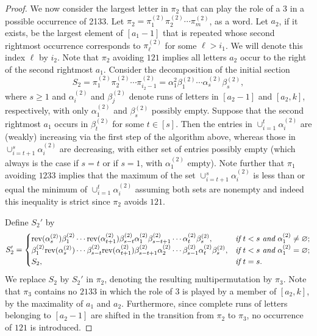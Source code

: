 \documentclass[11pt]{amsart}
\theoremstyle{plain}
\theoremstyle{definition}
\begin{document}
\begin{proof}
We now consider the largest letter in $\pi_2$ that can play the role of a $3$  in a possible
occurrence of 2133.  Let $\pi_2=\pi_1^{(2)}\pi_2^{(2)}\cdots\pi_m^{(2)}$, as a word.  Let $a_2$, if
it exists, be the largest element of $[a_1-1]$ that is repeated whose second rightmost occurrence
corresponds to $\pi_\ell^{(2)}$ for some $\ell>i_1$.  We will denote this index $\ell$ by $i_2$. Note
that $\pi_2$ avoiding $121$ implies all letters $a_2$ occur to the right of the second rightmost
$a_1$.  Consider the decomposition of the initial section
$$S_2=\pi_1^{(2)}\pi_2^{(2)}\cdots \pi_{i_2-1}^{(2)}=\alpha_1^{2}\beta_1^{(2)}\cdots
\alpha_s^{(2)}\beta_s^{(2)},$$
where $s \geq 1$ and $\alpha_i^{(2)}$ and $\beta_j^{(2)}$ denote runs of letters in $[a_2-1]$ and
$[a_2,k]$, respectively, with only $\alpha_1^{(2)}$ and $\beta_s^{(2)}$ possibly empty.  Suppose that
the second rightmost $a_1$ occurs in $\beta_t^{(2)}$ for some $t \in [s]$.  Then the entries in
$\cup_{i=1}^t\alpha_i^{(2)}$ are (weakly) increasing via the first step of the algorithm above,
whereas those in $\cup_{i=t+1}^s\alpha_i^{(2)}$ are decreasing, with either set of entries possibly
empty (which always is the case if $s=t$ or if $s=1$, with $\alpha_1^{(2)}$ empty).  Note further
that $\pi_1$ avoiding $1233$ implies that the maximum of the set $\cup_{i=t+1}^s\alpha_i^{(2)}$ is
less than or equal the minimum of  $\cup_{i=1}^t\alpha_i^{(2)}$ assuming both sets are nonempty and
indeed this inequality is strict since $\pi_2$ avoids $121$.

Define $S_2'$ by
$$S_2'=\begin{cases}
{\displaystyle
\text{rev}(\alpha_s^{(2)})\beta_1^{(2)}\cdots\text{rev}(\alpha_{t+1}^{(2)})\beta_{s-t}^{(2)}
\alpha_1^{(2)}\beta_{s-t+1}^{(2)}\cdots \alpha_t^{(2)}\beta_s^{(2)}},
&\emph{if}~t<s~\emph{and}~\alpha_1^{(2)}\neq\varnothing;\\
{\displaystyle
\beta_1^{(2)}\text{rev}(\alpha_s^{(2)})\cdots\beta_{s-t}^{(2)}\text{rev}(\alpha_{t+1}^{(2)})
\beta_{s-t+1}^{(2)}\alpha_2^{(2)}\cdots\beta_{s-1}^{(2)}\alpha_t^{(2)}\beta_s^{(2)}},
&\emph{if}~t<s~\emph{and}~\alpha_1^{(2)}=\varnothing;\\
{\displaystyle S_2}, &\emph{if}~t=s.
\end{cases}$$
We replace $S_2$ by $S_2'$ in $\pi_2$, denoting the resulting multipermutation by $\pi_3$.  Note
that $\pi_3$ contains no $2133$ in which the role of 3 is played by a member of $[a_2,k]$, by the
maximality of $a_1$ and $a_2$.  Furthermore, since complete runs of letters belonging to $[a_2-1]$
are shifted in the transition from $\pi_2$ to $\pi_3$, no occurrence of $121$ is introduced.


\end{proof}
\end{document}
